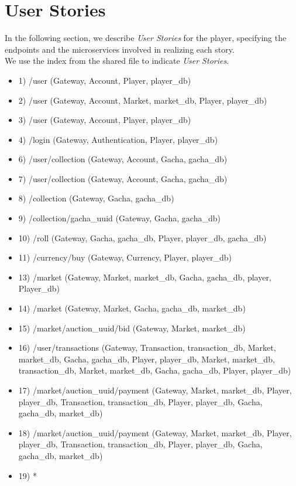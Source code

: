 \documentclass{article}
\begin{document}
\newpage

\section{User Stories}
In the following section, we describe \emph{User Stories} for the player, specifying the endpoints and the microservices involved in realizing each story.\\ We use the index from the shared file to indicate \emph{User Stories}.
\vspace{1em}

\begin{itemize}
    \item 1) /user (Gateway, Account, Player, player\_db)
    \item 2) /user (Gateway, Account, Market, market\_db, Player, player\_db)
    \item 3) /user (Gateway, Account, Player, player\_db)
    \item 4) /login (Gateway, Authentication, Player, player\_db)
    \item 6) /user/collection (Gateway, Account, Gacha, gacha\_db)
    \item 7) /user/collection (Gateway, Account, Gacha, gacha\_db)
    \item 8) /collection (Gateway, Gacha, gacha\_db)
    \item 9) /collection/{gacha\_uuid} (Gateway, Gacha, gacha\_db)
    \item 10) /roll (Gateway, Gacha, gacha\_db, Player, player\_db, gacha\_db)
    \item 11) /currency/buy (Gateway, Currency, Player, player\_db)
    \item 13) /market (Gateway, Market, market\_db, Gacha, gacha\_db, player, Player\_db)
    \item 14) /market (Gateway, Market, Gacha, gacha\_db, market\_db)
    \item 15) /market/{auction\_uuid}/bid (Gateway, Market, market\_db)
    \item 16) /user/transactions (Gateway, Transaction, transaction\_db, Market, market\_db, Gacha, gacha\_db, Player, player\_db, Market, market\_db, transaction\_db, Market, market\_db, Gacha, gacha\_db, Player, player\_db)
    \item 17) /market/{auction\_uuid}/payment (Gateway, Market, market\_db, Player, player\_db, Transaction, transaction\_db, Player, player\_db, Gacha, gacha\_db, market\_db)
    \item 18) /market/{auction\_uuid}/payment (Gateway, Market, market\_db, Player, player\_db, Transaction, transaction\_db, Player, player\_db, Gacha, gacha\_db, market\_db)
    \item 19) *
\end{itemize}
\end{document}
